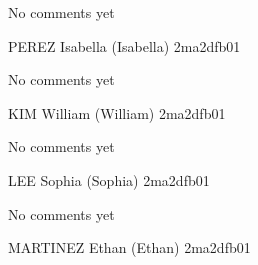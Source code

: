 \documentclass[11pt]{article}
\begin{document}
No comments yet

\newpage

PEREZ Isabella (Isabella) \hfill 2ma2dfb01 \\

\noindent
\begin{minipage}[t]{0.49\textwidth}
\centering
{}
\end{minipage}
\hfill
\begin{minipage}[t]{0.49\textwidth}
\centering
{}
\end{minipage}

No comments yet

\newpage

KIM William (William) \hfill 2ma2dfb01 \\

\noindent
\begin{minipage}[t]{0.49\textwidth}
\centering
{}
\end{minipage}
\hfill
\begin{minipage}[t]{0.49\textwidth}
\centering
{}
\end{minipage}

No comments yet

\newpage

LEE Sophia (Sophia) \hfill 2ma2dfb01 \\

\noindent
\begin{minipage}[t]{0.49\textwidth}
\centering
{}
\end{minipage}
\hfill
\begin{minipage}[t]{0.49\textwidth}
\centering
{}
\end{minipage}

No comments yet

\newpage

MARTINEZ Ethan (Ethan) \hfill 2ma2dfb01 \\

\noindent
\begin{minipage}[t]{0.49\textwidth}
\centering
{}
\end{minipage}
\hfill
\begin{minipage}[t]{0.49\textwidth}
\centering
{}
\end{minipage}
\end{document}
